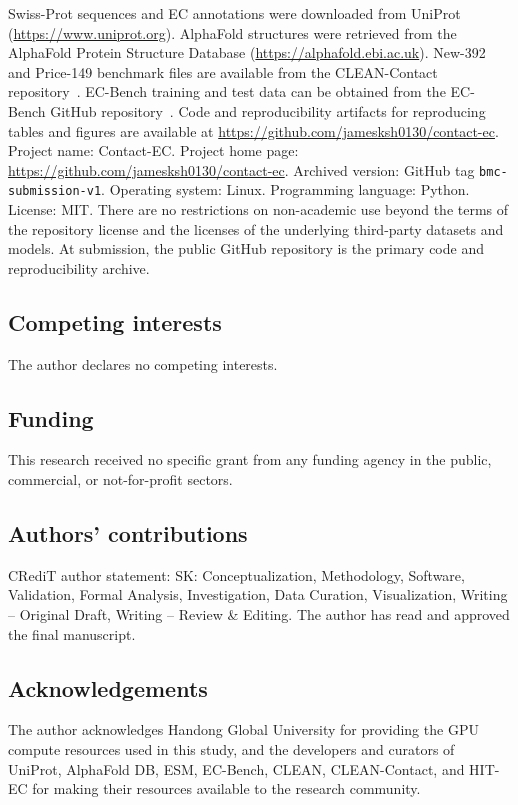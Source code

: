 \documentclass[numbered,contemporary,mediumone]{oup-authoring-template}
\begin{document}
Swiss-Prot sequences and EC annotations were downloaded from
UniProt~\citep{uniprot2023} (\url{https://www.uniprot.org}). AlphaFold structures were retrieved from the
AlphaFold Protein Structure Database (\url{https://alphafold.ebi.ac.uk}).
New-392 and Price-149 benchmark files are available from the CLEAN-Contact
repository~\citep{ayres2024}. EC-Bench training and test data can be obtained from the EC-Bench
GitHub repository~\citep{davoudi2026}. Code and reproducibility artifacts for reproducing tables
and figures are available at \url{https://github.com/jamesksh0130/contact-ec}.
Project name: Contact-EC. Project home page:
\url{https://github.com/jamesksh0130/contact-ec}. Archived version:
GitHub tag \texttt{bmc-submission-v1}. Operating system:
Linux. Programming language: Python. License: MIT. There are no restrictions
on non-academic use beyond the terms of the repository license and the licenses
of the underlying third-party datasets and models. At submission, the public
GitHub repository is the primary code and reproducibility archive.

\subsection*{Competing interests}
The author declares no competing interests.

\subsection*{Funding}
This research received no specific grant from any funding agency in the public,
commercial, or not-for-profit sectors.

\subsection*{Authors' contributions}
CRediT author statement: SK: Conceptualization, Methodology,
Software, Validation, Formal Analysis, Investigation, Data Curation,
Visualization, Writing -- Original Draft, Writing -- Review \& Editing.
The author has read and approved the final manuscript.

\subsection*{Acknowledgements}
The author acknowledges Handong Global University for providing the GPU
compute resources used in this study, and the developers and curators of
UniProt, AlphaFold DB, ESM, EC-Bench, CLEAN, CLEAN-Contact, and HIT-EC for
making their resources available to the research community.



\end{document}
